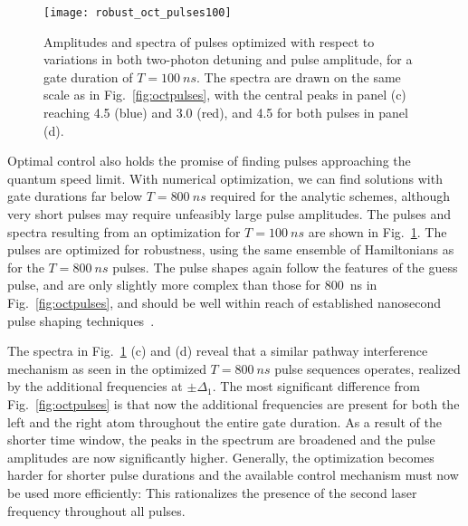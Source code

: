\begin{figure}[tb]
  \centering
  \texttt{[image: robust\_oct\_pulses100]}
  \caption{%
  Amplitudes and spectra of pulses optimized with respect to variations
  in both two-photon detuning and pulse amplitude, for a gate duration of
  $T=\SI{100}{ns}$. The spectra are drawn on the same scale as in
  Fig.~\ref{fig:octpulses}, with the central peaks in panel (c) reaching 4.5
  (blue) and 3.0 (red), and 4.5 for both pulses in panel (d).
  }
  \label{fig:octpulses100}
\end{figure}
Optimal control also holds the promise of finding pulses approaching the quantum
speed limit. With numerical optimization, we can find solutions with
gate durations far below $T=\SI{800}{ns}$
required for the analytic schemes, although very short pulses may require
unfeasibly large pulse amplitudes.
The pulses and spectra resulting from an
optimization for $T=\SI{100}{ns}$ are shown in Fig.~\ref{fig:octpulses100}. The
pulses are optimized for robustness, using the same ensemble of Hamiltonians
as for the $T=\SI{800}{ns}$ pulses. The pulse shapes again follow the features of the
guess pulse, and are only slightly more complex than those for \SI{800}{ns} in
Fig.~\ref{fig:octpulses}, and should be well within reach of established
nanosecond pulse shaping techniques~\cite{WrightRSI04}.

The spectra in Fig.~\ref{fig:octpulses100} (c) and (d)  reveal that
a similar pathway interference
mechanism as seen in the optimized  $T=\SI{800}{ns}$ pulse sequences
operates, realized by the additional frequencies at $\pm
\Delta_1$. The most significant
difference from Fig.~\ref{fig:octpulses} is that now the additional frequencies
are present for both the left and the right atom throughout the entire gate
duration. As a result of the shorter time window,
the peaks in the spectrum are broadened and the
pulse amplitudes are now significantly higher. Generally, the optimization
becomes harder for shorter pulse durations and the available control
mechanism must now be used more efficiently: This rationalizes the
presence of the second laser frequency throughout all pulses.

